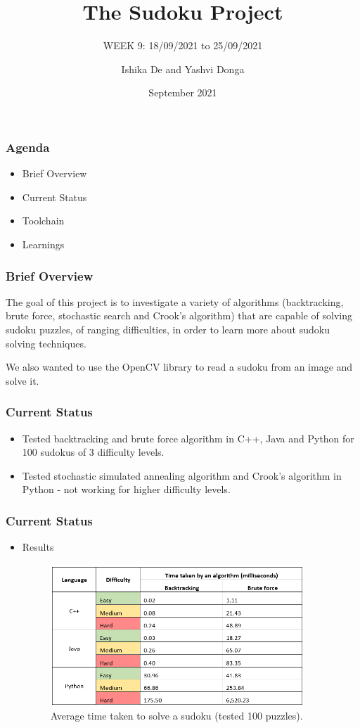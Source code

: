 \documentclass{beamer}
\title{The Sudoku Project}
\subtitle{WEEK 9: 18/09/2021 to 25/09/2021}
\author[Ishika | Yashvi]{Ishika De and Yashvi Donga}
\date{September 2021}
\begin{document}
\begin{frame}
     \titlepage
\end{frame}
\begin{frame}
     \frametitle{Agenda}
     \begin{itemize}
          \item Brief Overview
          \item Current Status
          \item Toolchain
          \item Learnings
     \end{itemize}
\end{frame}

\begin{frame}
     \frametitle{Brief Overview}
     The goal of this project is to investigate a variety of algorithms (backtracking, brute force, stochastic search and Crook's algorithm) that are capable of solving sudoku puzzles, of ranging difficulties, in order to learn more about sudoku solving techniques.\newline

     We also wanted to use the OpenCV library to read a sudoku from an image and solve it.
\end{frame}

\begin{frame}
     \frametitle{Current Status}   
     \begin{itemize}
		  \item Tested backtracking and brute force algorithm in C++, Java and Python for 100 sudokus of 3 difficulty levels.
		  \item Tested stochastic simulated annealing algorithm and Crook's algorithm in Python - not working for higher difficulty levels.
	 \end{itemize}
\end{frame}

\begin{frame}
     \frametitle{Current Status}   
     \begin{itemize}
		  \item Results
		  \begin{figure}
		  \includegraphics[width=0.9\textwidth]{./week9_img/data.png}
		  \caption{Average time taken to solve a sudoku (tested 100 puzzles).}
		  \centering
		  \end{figure}
	 \end{itemize}
\end{frame}
\end{document}
